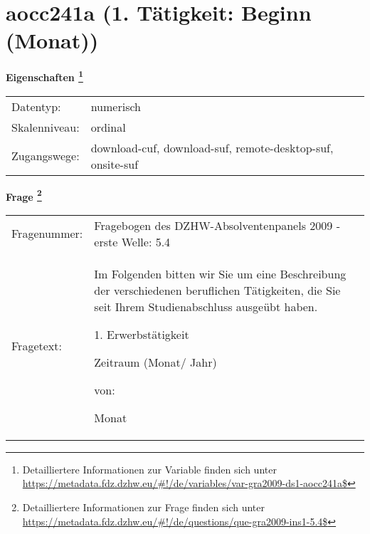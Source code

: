 
    \setcounter{footnote}{0}

    \vspace*{-1.8cm}
	\section{aocc241a (1. Tätigkeit: Beginn (Monat))}
	\label{section:aocc241a}



    \vspace*{0.5cm}
    \noindent\textbf{Eigenschaften
	\footnote{Detailliertere Informationen zur Variable finden sich unter
		\url{https://metadata.fdz.dzhw.eu/\#!/de/variables/var-gra2009-ds1-aocc241a$}}}\\
	\begin{tabularx}{\hsize}{@{}lX}
	Datentyp: & numerisch \\
	Skalenniveau: & ordinal \\
	Zugangswege: &
	  download-cuf, 
	  download-suf, 
	  remote-desktop-suf, 
	  onsite-suf
 \\
    \end{tabularx}



				\vspace*{0.5cm}
                \noindent\textbf{Frage
	                \footnote{Detailliertere Informationen zur Frage finden sich unter
		              \url{https://metadata.fdz.dzhw.eu/\#!/de/questions/que-gra2009-ins1-5.4$}}}\\
				\begin{tabularx}{\hsize}{@{}lX}
					Fragenummer: &
					  Fragebogen des DZHW-Absolventenpanels 2009 - erste Welle:
					  5.4
 \\
					Fragetext: & Im Folgenden bitten wir Sie um eine Beschreibung der verschiedenen beruflichen Tätigkeiten, die Sie seit Ihrem Studienabschluss ausgeübt haben.\par  1. Erwerbstätigkeit\par  Zeitraum (Monat/ Jahr)\par  von:\par  Monat \\
				\end{tabularx}





